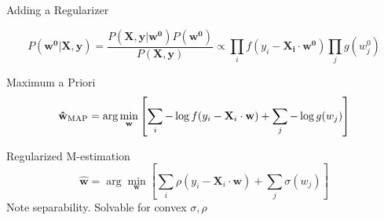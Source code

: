\documentclass[pdf]{beamer}
\begin{document}
\begin{frame}[t]{Adding a Regularizer}

    \begin{equation*}
        P(\mathbf{w^0}|\mathbf{X},\mathbf{y}) = \frac{P(\mathbf{X},\mathbf{y}|\mathbf{w^0})P(\mathbf{w^0})}{P(\mathbf{X},\mathbf{y})}\propto \prod_i{f(y_i-\mathbf{X_i}\cdot \mathbf{w^0})}\prod_j{g(w_j^0)}
    \end{equation*}

    \begin{block}{Maximum a Priori}
        \begin{equation*}
            \small{\mathbf{\hat{w}_{\text{MAP}}} =\arg\min_{\mathbf{w}}{\left[\sum_i{-\log f(y_i - \mathbf{X}_i\cdot \mathbf{w})} +\sum_j{-\log{g(w_j)}}\right]}}
        \end{equation*}
    \end{block}

    \begin{block}{Regularized M-estimation}
    \begin{equation*}
        \mathbf{\hat{w}}=\arg \min_{\mathbf{w}}{\left[ \sum_{i} {\rho\left( y_i - \mathbf{X}_{i} \cdot \mathbf{w}\right)} + \sum_j{\sigma(w_j)}\right]}
    \end{equation*}
    Note separability. Solvable for convex $\sigma,\rho$
    \end{block}

\end{frame}
\end{document}
